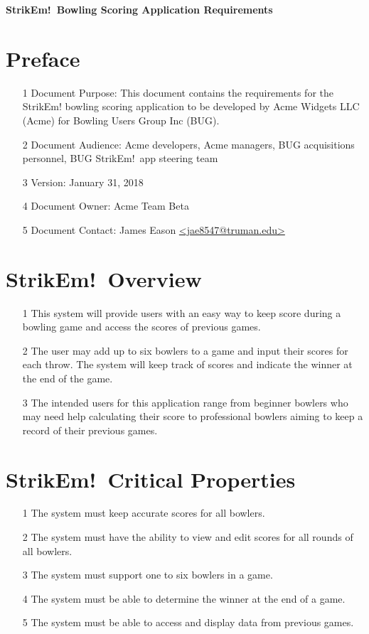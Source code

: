 \documentclass[11pt]{article}
\begin{document}
\thispagestyle{empty}
\begin{center}
  \Large{\textbf{StrikEm!\ Bowling Scoring Application Requirements}\\}
\end{center}

\section{Preface}

\begin{enumerate}
\item[1] Document Purpose: This document contains the requirements for
  the StrikEm! bowling scoring application to be developed by Acme Widgets LLC
  (Acme) for Bowling Users Group Inc (BUG).
\item[2] Document Audience: Acme developers, Acme managers, BUG acquisitions
  personnel, BUG StrikEm!\ app steering team
\item[3] Version: January 31, 2018
\item[4] Document Owner: Acme Team Beta
\item[5] Document Contact: James Eason \url{<jae8547@truman.edu>}
\end{enumerate}

\section{StrikEm!\ Overview}
\begin{enumerate}
\item[1] This system will provide users with an easy way to keep score during a bowling game and access the scores of previous games.
\item[2] The user may add up to six bowlers to a game and input their scores for each throw. The system will keep track of scores and indicate the winner at the end of the game.
\item[3] The intended users for this application range from beginner bowlers who may need help calculating their score to professional bowlers aiming to keep a record of their previous games.
\end{enumerate}

\section{StrikEm!\ Critical Properties}
\begin{enumerate}
\item[1] The system must keep accurate scores for all bowlers.
\item[2] The system must have the ability to view and edit scores for all rounds of all bowlers.
\item[3] The system must support one to six bowlers in a game.
\item[4] The system must be able to determine the winner at the end of a game.
\item[5] The system must be able to access and display data from previous games.
\end{enumerate}
\end{document}
